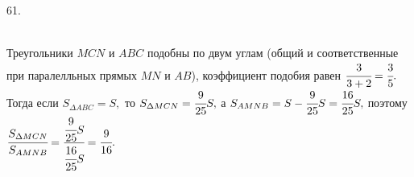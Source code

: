 61. \begin{figure}[ht!]
\end{figure}\\
Треугольники $MCN$ и $ABC$ подобны по двум углам (общий и соответственные при паралелльных прямых $MN$ и $AB$), коэффициент подобия равен $\cfrac{3}{3+2}=\cfrac{3}{5}.$ Тогда если $S_{\Delta ABC}=S,$ то $S_{\Delta MCN}=\cfrac{9}{25}S,$ а $S_{AMNB}=S-\cfrac{9}{25}S=\cfrac{16}{25}S,$ поэтому $\cfrac{S_{\Delta MCN}}{S_{AMNB}}=\cfrac{\cfrac{9}{25}S}{\cfrac{16}{25}S}=\cfrac{9}{16}.$\\
